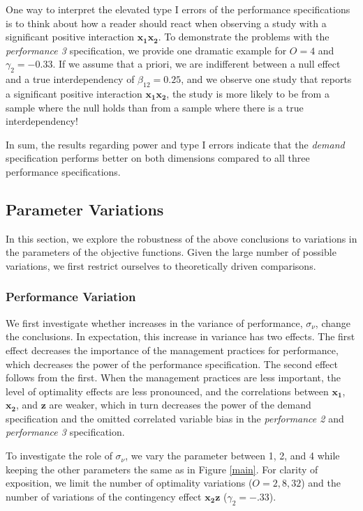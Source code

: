 \documentclass[12pt]{article}
\begin{document}
One way to interpret the elevated type I errors of the performance specifications is to think about how a reader should react when observing a study with a significant positive interaction \(\mathbf{x_1 x_2}\). To demonstrate the problems with the \emph{performance 3} specification, we provide one dramatic example for \(O = 4\) and \(\gamma_2 = -0.33\). If we assume that a priori, we are indifferent between a null effect and a true interdependency of \(\beta_{12} = 0.25\), and we observe one study that reports a significant positive interaction \(\mathbf{x_{1} x_{2}}\), the study is more likely to be from a sample where the null holds than from a sample where there is a true interdependency!

In sum, the results regarding power and type I errors indicate that the \emph{demand} specification performs better on both dimensions compared to all three performance specifications.

\subsection{Parameter Variations}\label{parameter-variations}

In this section, we explore the robustness of the above conclusions to variations in the parameters of the objective functions. Given the large number of possible variations, we first restrict ourselves to theoretically driven comparisons.

\subsubsection{Performance Variation}\label{performance-variation}

We first investigate whether increases in the variance of performance, $\sigma_{\nu}$, change the conclusions. In expectation, this increase in variance has two effects. The first effect decreases the importance of the management practices for performance, which decreases the power of the performance specification. The second effect follows from the first. When the management practices are less important, the level of optimality effects are less pronounced, and the correlations between $\mathbf{x_1}$, $\mathbf{x_2}$, and $\mathbf{z}$ are weaker, which in turn decreases the power of the demand specification and the omitted correlated variable bias in the \emph{performance 2} and \emph{performance 3} specification.

To investigate the role of $\sigma_{\nu}$, we vary the parameter between 1, 2, and 4 while keeping the other parameters the same as in Figure \ref{main}. For clarity of exposition, we limit the number of optimality variations ($O = 2, 8, 32$) and the number of variations of the contingency effect $\mathbf{x_2 z}$ ($\gamma_2 = -.33$).
\end{document}
